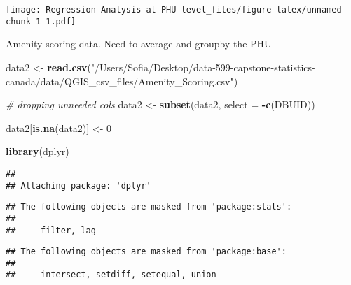 \documentclass[]{article}
\newenvironment{Shaded}{\begin{snugshade}}{\end{snugshade}}
\newcommand{\CommentTok}[1]{\textcolor[rgb]{0.56,0.35,0.01}{\textit{#1}}}
\newcommand{\DataTypeTok}[1]{\textcolor[rgb]{0.13,0.29,0.53}{#1}}
\newcommand{\DecValTok}[1]{\textcolor[rgb]{0.00,0.00,0.81}{#1}}
\newcommand{\KeywordTok}[1]{\textcolor[rgb]{0.13,0.29,0.53}{\textbf{#1}}}
\newcommand{\NormalTok}[1]{#1}
\newcommand{\OperatorTok}[1]{\textcolor[rgb]{0.81,0.36,0.00}{\textbf{#1}}}
\newcommand{\StringTok}[1]{\textcolor[rgb]{0.31,0.60,0.02}{#1}}
\begin{document}
\texttt{[image: Regression-Analysis-at-PHU-level\_files/figure-latex/unnamed-chunk-1-1.pdf]}

Amenity scoring data. Need to average and groupby the PHU

\begin{Shaded}
\begin{Highlighting}[]
\NormalTok{data2 \textless{}{-}}\StringTok{ }\KeywordTok{read.csv}\NormalTok{(}\StringTok{"/Users/Sofia/Desktop/data{-}599{-}capstone{-}statistics{-}canada/data/QGIS\_csv\_files/Amenity\_Scoring.csv"}\NormalTok{)}

\CommentTok{\# dropping unneeded cols}
\NormalTok{data2 \textless{}{-}}\StringTok{ }\KeywordTok{subset}\NormalTok{(data2, }\DataTypeTok{select =} \OperatorTok{{-}}\KeywordTok{c}\NormalTok{(DBUID))}

\NormalTok{data2[}\KeywordTok{is.na}\NormalTok{(data2)] \textless{}{-}}\StringTok{ }\DecValTok{0}

\KeywordTok{library}\NormalTok{(dplyr)}
\end{Highlighting}
\end{Shaded}

\begin{verbatim}
## 
## Attaching package: 'dplyr'
\end{verbatim}

\begin{verbatim}
## The following objects are masked from 'package:stats':
## 
##     filter, lag
\end{verbatim}

\begin{verbatim}
## The following objects are masked from 'package:base':
## 
##     intersect, setdiff, setequal, union
\end{verbatim}

\begin{Shaded}
\end{Shaded}
\end{document}

